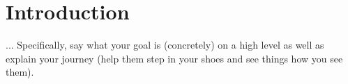 \documentclass{article} %
\begin{document}
%

%
%

% 
% 
% 
\section{Introduction}
... Specifically, say what your goal is (concretely) on a high level as well as explain your journey
(help them step in your shoes and see things how you see them).
\end{document}
